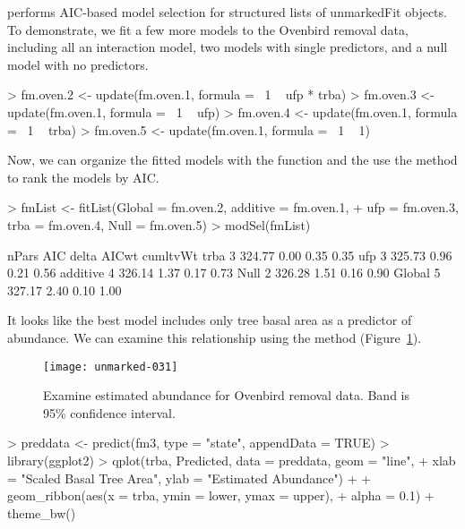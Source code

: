\documentclass[article,shortnames]{jss}
\begin{document}
 performs AIC-based model selection for structured lists of 
unmarkedFit objects.  To demonstrate, we fit a few more models to the Ovenbird
removal data, including all an interaction model, two models with
single predictors, and a null model with no predictors.

\begin{Schunk}
\begin{Sinput}
> fm.oven.2 <- update(fm.oven.1, formula = ~1 ~ ufp * trba)
> fm.oven.3 <- update(fm.oven.1, formula = ~1 ~ ufp)
> fm.oven.4 <- update(fm.oven.1, formula = ~1 ~ trba)
> fm.oven.5 <- update(fm.oven.1, formula = ~1 ~ 1)
\end{Sinput}
\end{Schunk}

Now, we can organize the fitted models with the  function and
the use the  method to rank the models by AIC.

\begin{Schunk}
\begin{Sinput}
> fmList <- fitList(Global = fm.oven.2, additive = fm.oven.1, 
+     ufp = fm.oven.3, trba = fm.oven.4, Null = fm.oven.5)
> modSel(fmList)
\end{Sinput}
\begin{Soutput}
         nPars    AIC delta AICwt cumltvWt
trba         3 324.77  0.00  0.35     0.35
ufp          3 325.73  0.96  0.21     0.56
additive     4 326.14  1.37  0.17     0.73
Null         2 326.28  1.51  0.16     0.90
Global       5 327.17  2.40  0.10     1.00
\end{Soutput}
\end{Schunk}

It looks like the best model includes only tree basal area as a
predictor of abundance.  We can examine this relationship using
the  method (Figure~\ref{fig:pred}).


\begin{figure}[ht]
  \centering
\texttt{[image: unmarked-031]}
\caption{Examine estimated abundance for Ovenbird removal data.  Band
  is 95\% confidence interval.}
\label{fig:pred}
\end{figure}

\begin{Schunk}
\begin{Sinput}
> preddata <- predict(fm3, type = "state", appendData = TRUE)
> library(ggplot2)
> qplot(trba, Predicted, data = preddata, geom = "line", 
+     xlab = "Scaled Basal Tree Area", ylab = "Estimated Abundance") + 
+     geom_ribbon(aes(x = trba, ymin = lower, ymax = upper), 
+         alpha = 0.1) + theme_bw()
\end{Sinput}
\end{Schunk}
\end{document}
